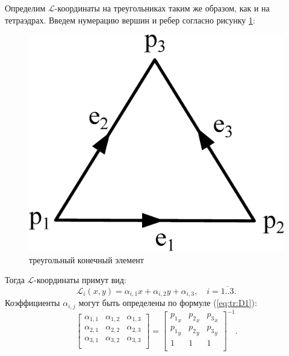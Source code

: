 \documentclass[a4paper,12pt]{article}
\begin{document}
Определим $\mathcal{L}$-координаты на треугольниках таким же образом, как и на тетраэдрах. Введем нумерацию вершин и ребер согласно рисунку \ref{fig:theory:triangle}:
\begin{figure}[H]
	\centering
	\includegraphics[scale=0.25]{theory/triangle.eps}
	\caption{треугольный конечный элемент}
	\label{fig:theory:triangle}
\end{figure}

\noindent Тогда $\mathcal{L}$-координаты примут вид:
\begin{equation*}
	\mathcal{L}_i (x, y) = \alpha_{i, 1} x + \alpha_{i, 2} y + \alpha_{i, 3} , \text{~~~} i = \overline{1..3} . \label{eq:tr:L}
\end{equation*}
Коэффициенты $\alpha_{i, j}$ могут быть определены по формуле (\ref{eq:tr:D1}):
\begin{equation}
	\left[
	\begin{matrix}
		\alpha_{1, 1} & \alpha_{1, 2} & \alpha_{1, 3} \\
		\alpha_{2, 1} & \alpha_{2, 2} & \alpha_{2, 3} \\
		\alpha_{3, 1} & \alpha_{3, 2} & \alpha_{3, 3} \\
	\end{matrix}
	\right] = \left[
	\begin{matrix}
		{p_1}_x & {p_2}_x & {p_3}_x \\
		{p_1}_y & {p_2}_y & {p_3}_y \\
		1 & 1 & 1 \\
	\end{matrix}
	\right]^{-1} . \label{eq:tr:D1}
\end{equation}
\end{document}
